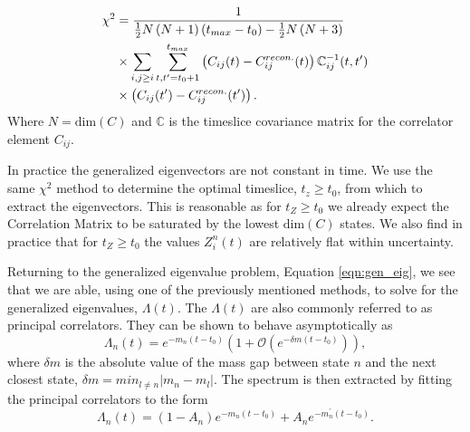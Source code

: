 \begin{align}
\label{eqn:chisq}
\chi^2 &= \frac{1}{\frac{1}{2}N\left(N+1\right)\left(t_{max}-t_0\right) -\frac{1}{2}N\left(N+3\right)} \notag\\
&\times\sum_{i,j\ge i}\sum_{t,t^{\prime}=t_0+1}^{t_{max}}\left(C_{ij}(t) - C_{ij}^{recon.}(t)\right)\mathbb{C}_{ij}^{-1}(t,t^{\prime}) \notag\\
&\times\left(C_{ij}(t^{\prime}) - C_{ij}^{recon.}(t^{\prime})\right).
\end{align}
Where $N = \mathrm{dim}(C)$ and $\mathbb{C}$ is the timeslice covariance matrix for the correlator element $C_{ij}$. 
\par
In practice the generalized eigenvectors are not constant in time.  We use the same $\chi^2$ method to determine the optimal timeslice, $t_z \geq t_0$, from which to extract the eigenvectors. This is reasonable as for $t_Z \geq t_0$ we already expect the Correlation Matrix to be saturated by the lowest $\mathrm{dim}(C)$ states.  We also find in practice that for $t_Z \geq t_0$ the values $Z_i^n(t)$ are relatively flat within uncertainty. 
\par
Returning to the generalized eigenvalue problem, Equation \ref{eqn:gen_eig}, we see that we are able, using one of the previously mentioned methods, to solve for the generalized eigenvalues, $\Lambda(t)$. The $\Lambda(t)$ are also commonly referred to as principal correlators. They can be shown to behave asymptotically as \cite[Appendix A]{luscher90}
\begin{equation*}
\Lambda_n(t) = e^{-m_n\left(t - t_0\right)}\left(1+\mathcal{O}\left(e^{-\delta m\left(t - t_0\right)}\right)\right),
\end{equation*}
where $\delta m$ is the absolute value of the mass gap between state $n$ and the next closest state, $\delta m = min_{l\neq n}\left| m_n - m_l\right|$.  
The spectrum is then extracted by fitting the principal correlators to the form 
\begin{equation}
\label{fitform}
\Lambda_n(t) = \left(1-A_n\right)e^{-m_n\left(t - t_0\right)} + A_ne^{-m_n^{\prime}\left(t - t_0\right)}.
\end{equation}

